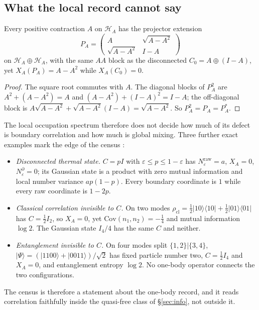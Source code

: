 \subsection{What the local record cannot say}\label{sec:cannot}
\begin{proposition}\label{prop:extension}
Every positive contraction $A$ on $\mathcal H_A$ has the projector extension
\[
P_A=\begin{pmatrix}A&\sqrt{A-A^2}\\\sqrt{A-A^2}&I-A\end{pmatrix}
\]
on $\mathcal H_A\oplus\mathcal H_A$, with the same $AA$ block as the disconnected $C_0=A\oplus(I-A)$, yet $X_A(P_A)=A-A^2$ while $X_A(C_0)=0$. 
\end{proposition}
\begin{proof}
The square root commutes with $A$. The diagonal blocks of $P_A^2$ are $A^2+(A-A^2)=A$ and $(A-A^2)+(I-A)^2=I-A$; the off-diagonal block is $A\sqrt{A-A^2}+\sqrt{A-A^2}(I-A)=\sqrt{A-A^2}$. So $P_A^2=P_A=P_A^*$.
\end{proof}
The local occupation spectrum therefore does not decide how much of its defect is boundary correlation and how much is global mixing. Three further exact examples mark the edge of the census :
\begin{itemize}
\item \emph{Disconnected thermal state.} $C=pI$ with $\varepsilon\le p\le1-\varepsilon$ has $N^{\mathrm{raw}}_\varepsilon=a$, $X_A=0$, $N^\partial_\varepsilon=0$; its Gaussian state is a product with zero mutual information and local number variance $ap(1-p)$. Every boundary coordinate is $1$ while every raw coordinate is $1-2p$.
\item \emph{Classical correlation invisible to $C$.} On two modes $\rho_{\mathrm{cl}}=\tfrac12|10\rangle\langle10|+\tfrac12|01\rangle\langle01|$ has $C=\tfrac12I_2$, so $X_A=0$, yet $\mathrm{Cov}(n_1,n_2)=-\tfrac14$ and mutual information $\log2$. The Gaussian state $I_4/4$ has the same $C$ and neither.
\item \emph{Entanglement invisible to $C$.} On four modes split $\{1,2\}|\{3,4\}$, $|\Psi\rangle=(|1100\rangle+|0011\rangle)/\sqrt2$ has fixed particle number two, $C=\tfrac12I_4$ and $X_A=0$, and entanglement entropy $\log2$. No one-body operator connects the two configurations.
\end{itemize}
The census is therefore a statement about the one-body record, and it reads correlation faithfully inside the quasi-free class of §\ref{sec:info}, not outside it.

